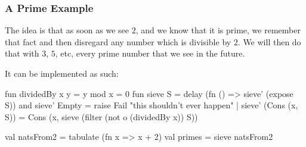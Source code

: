 \documentclass[aspectratio=169, handout]{beamer}
\begin{document}
\begin{frame}[fragile]
  \frametitle{A Prime Example}

  \ptmt

  The idea is that as soon as we see $2$, and we know that it is prime, we remember
  that fact and then disregard any number which is divisible by $2$. We will then
  do that with $3$, $5$, etc, every prime number that we see in the future.

  \pause
  \vspace{\fill}

  It can be implemented as such:
  \begin{codeblock}
    fun dividedBy x y = y mod x = 0
    fun sieve  S = delay (fn () => sieve' (expose S))
    and sieve' Empty = raise Fail "this shouldn't ever happen"
      | sieve' (Cons (x, S)) =
          Cons (x, sieve (filter (not o (dividedBy x)) S))

    val natsFrom2 = tabulate (fn x => x + 2)
    val primes = sieve natsFrom2
  \end{codeblock}
\end{frame}



\thankyou
\end{document}
